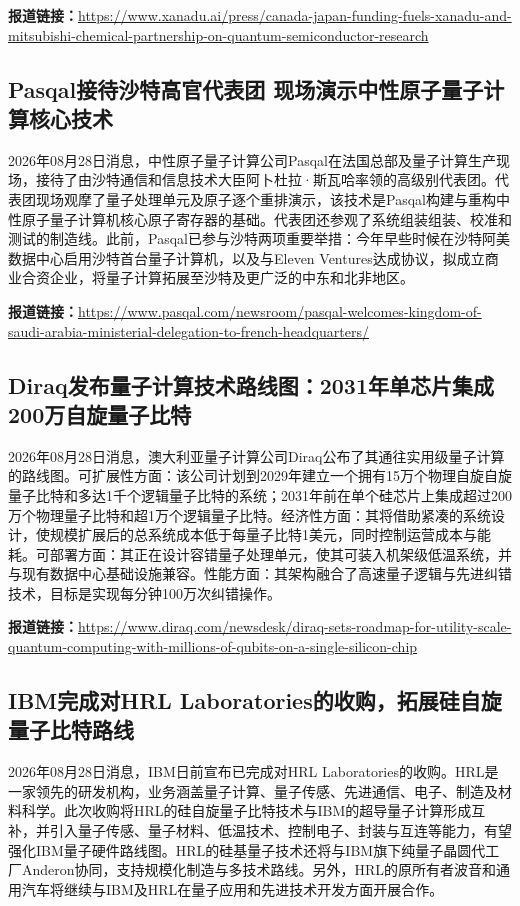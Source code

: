 \documentclass[12pt,a4paper]{ctexart}
\begin{document}
\noindent\textbf{报道链接：}\url{https://www.xanadu.ai/press/canada-japan-funding-fuels-xanadu-and-mitsubishi-chemical-partnership-on-quantum-semiconductor-research}

\subsection{ Pasqal接待沙特高官代表团 现场演示中性原子量子计算核心技术 }

2026年08月28日消息，中性原子量子计算公司Pasqal在法国总部及量子计算生产现场，接待了由沙特通信和信息技术大臣阿卜杜拉·斯瓦哈率领的高级别代表团。代表团现场观摩了量子处理单元及原子逐个重排演示，该技术是Pasqal构建与重构中性原子量子计算机核心原子寄存器的基础。代表团还参观了系统组装组装、校准和测试的制造线。此前，Pasqal已参与沙特两项重要举措：今年早些时候在沙特阿美数据中心启用沙特首台量子计算机，以及与Eleven Ventures达成协议，拟成立商业合资企业，将量子计算拓展至沙特及更广泛的中东和北非地区。

\noindent\textbf{报道链接：}\url{https://www.pasqal.com/newsroom/pasqal-welcomes-kingdom-of-saudi-arabia-ministerial-delegation-to-french-headquarters/}

\subsection{ Diraq发布量子计算技术路线图：2031年单芯片集成200万自旋量子比特 }

2026年08月28日消息，澳大利亚量子计算公司Diraq公布了其通往实用级量子计算的路线图。可扩展性方面：该公司计划到2029年建立一个拥有15万个物理自旋自旋量子比特和多达1千个逻辑量子比特的系统；2031年前在单个硅芯片上集成超过200万个物理量子比特和超1万个逻辑量子比特。经济性方面：其将借助紧凑的系统设计，使规模扩展后的总系统成本低于每量子比特1美元，同时控制运营成本与能耗。可部署方面：其正在设计容错量子处理单元，使其可装入机架级低温系统，并与现有数据中心基础设施兼容。性能方面：其架构融合了高速量子逻辑与先进纠错技术，目标是实现每分钟100万次纠错操作。

\noindent\textbf{报道链接：}\url{https://www.diraq.com/newsdesk/diraq-sets-roadmap-for-utility-scale-quantum-computing-with-millions-of-qubits-on-a-single-silicon-chip}

\subsection{ IBM完成对HRL Laboratories的收购，拓展硅自旋量子比特路线 }

2026年08月28日消息，IBM日前宣布已完成对HRL Laboratories的收购。HRL是一家领先的研发机构，业务涵盖量子计算、量子传感、先进通信、电子、制造及材料科学。此次收购将HRL的硅自旋量子比特技术与IBM的超导量子计算形成互补，并引入量子传感、量子材料、低温技术、控制电子、封装与互连等能力，有望强化IBM量子硬件路线图。HRL的硅基量子技术还将与IBM旗下纯量子晶圆代工厂Anderon协同，支持规模化制造与多技术路线。另外，HRL的原所有者波音和通用汽车将继续与IBM及HRL在量子应用和先进技术开发方面开展合作。
\end{document}
